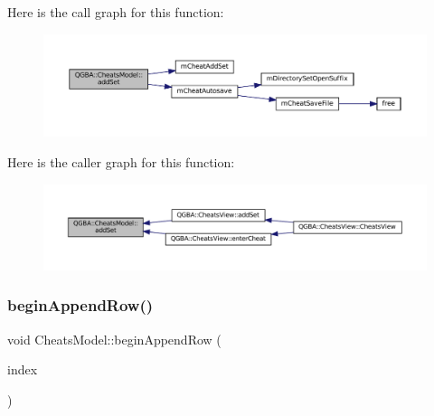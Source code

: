 Here is the call graph for this function\+:
\nopagebreak
\begin{figure}[H]
\begin{center}
\leavevmode
\includegraphics[width=350pt]{class_q_g_b_a_1_1_cheats_model_aab186665fb45851e46b12ef51df879e2_cgraph}
\end{center}
\end{figure}
Here is the caller graph for this function\+:
\nopagebreak
\begin{figure}[H]
\begin{center}
\leavevmode
\includegraphics[width=350pt]{class_q_g_b_a_1_1_cheats_model_aab186665fb45851e46b12ef51df879e2_icgraph}
\end{center}
\end{figure}
\mbox{\label{class_q_g_b_a_1_1_cheats_model_a6f4d9ca30bb173d60011b29de8ad290f}} 
\subsubsection{\texorpdfstring{begin\+Append\+Row()}{beginAppendRow()}}
{\footnotesize\ttfamily void Cheats\+Model\+::begin\+Append\+Row (\begin{DoxyParamCaption}\item[{const Q\+Model\+Index \&}]{index }\end{DoxyParamCaption})}

